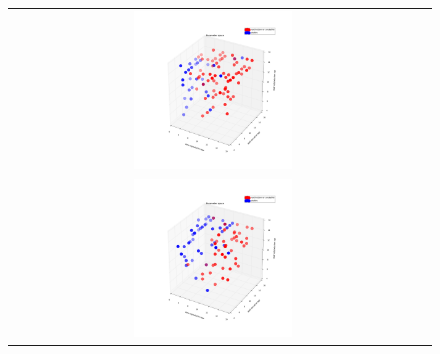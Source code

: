 \documentclass[a4paper,12pt]{article}
\begin{document}
\begin{figure}[H]
\begin{tabular}{@{}cc@{}}
                \includegraphics[width = 0.4\textwidth]{./pics/Restricted_Parameter_space_d500_w3000.png} \\
        	\includegraphics[width = 0.4\textwidth]{./pics/Restricted_Parameter_space_d250_w2500.png} \\
	\end{tabular}
        \label{RestrictParam}
  \end{figure}
\end{document}
